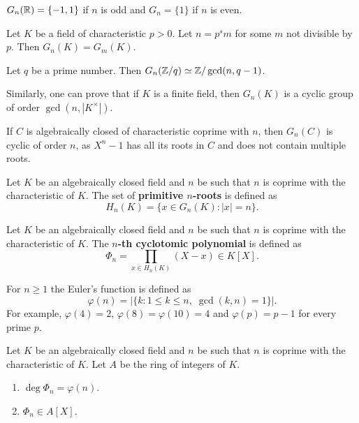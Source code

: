 \begin{example}
    $G_n(\mathbb{R})=\{-1,1\}$ if $n$ is odd and $G_{n}=\{1\}$ if $n$ is even.
\end{example}

\begin{exercise}
    Let $K$ be a field of characteristic $p>0$. Let $n=p^sm$ for some $m$ not divisible by $p$. 
    Then $G_n(K)=G_m(K)$. 
\end{exercise}

\begin{exercise}
    Let $q$ be a prime number. Then $G_n(\mathbb{Z}/q)\simeq\mathbb{Z}/\gcd(n,q-1)$. 
\end{exercise}

Similarly, one can prove that if $K$ is a finite field, then $G_n(K)$ is a cyclic group
of order $\gcd(n,|K^{\times}|)$. 

\begin{example}
    If $C$ is algebraically closed of characteristic coprime with $n$, 
    then $G_n(C)$ is cyclic of order $n$, as $X^n-1$ 
    has all its roots in $C$ and does not contain multiple roots. 
\end{example}

Let $K$ be an algebraically closed field and $n$ be
such that $n$ is coprime with the characteristic of $K$. The set of 
\textbf{primitive $n$-roots} is defined as 
\[
H_n(K)=\{x\in G_n(K):|x|=n\}.
\]

\begin{definition}
    Let $K$ be an algebraically closed field and $n$ be
    such that $n$ is coprime with the characteristic of $K$. The \textbf{$n$-th cyclotomic
    polynomial} is defined as 
    \[
    \Phi_n=\prod_{x\in H_n(K)}(X-x)\in K[X].
    \]
\end{definition}

For $n\geq1$ the Euler's function is defined as 
\[
\varphi(n)=|\{k:1\leq k\leq n,\;\gcd(k,n)=1\}|.
\]
For example, $\varphi(4)=2$, $\varphi(8)=\varphi(10)=4$ and $\varphi(p)=p-1$ for every prime $p$. 

\begin{proposition}
    Let $K$ be an algebraically closed field and $n$ be
    such that $n$ is coprime with the characteristic of $K$. Let $A$ be
    the ring of integers of $K$. 
    \begin{enumerate}
        \item $\deg\Phi_n=\varphi(n)$.
        \item $\Phi_n\in A[X]$.
    \end{enumerate}
\end{proposition}


